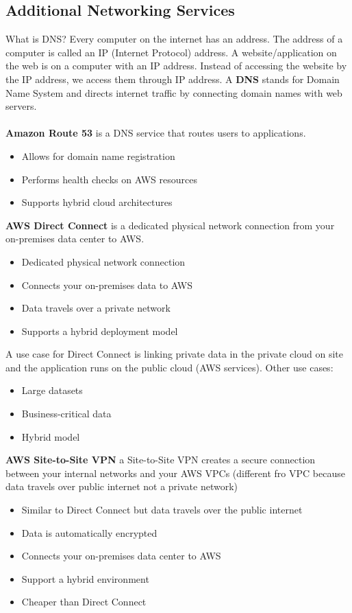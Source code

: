 \documentclass{article}%
\begin{document}
\subsection{Additional Networking Services}
What is DNS? Every computer on the internet has an address. The address of a computer is called an IP (Internet Protocol) address. A website/application on the web is on a computer with an IP address.
Instead of accessing the website by the IP address, we access them through IP address. A \textbf{DNS} stands for Domain Name System and directs internet traffic by connecting domain names with web servers. \\ \\
\textbf{Amazon Route 53} is a DNS service that routes users to applications.
\begin{itemize}
    \item Allows for domain name registration
    \item Performs health checks on AWS resources
    \item Supports hybrid cloud architectures
\end{itemize} 

\textbf{AWS Direct Connect} is a dedicated physical network connection from your on-premises data center to AWS.
\begin{itemize}
    \item Dedicated physical network connection
    \item Connects your on-premises data to AWS
    \item Data travels over a private network
    \item Supports a hybrid deployment model
\end{itemize}
A use case for Direct Connect is linking private data in the private cloud on site and the application runs on the public cloud (AWS services). Other use cases:
\begin{itemize}
    \item Large datasets
    \item Business-critical data
    \item Hybrid model
\end{itemize}

\textbf{AWS Site-to-Site VPN} a Site-to-Site VPN creates a secure connection between your internal networks and your AWS VPCs (different fro VPC because data travels over public internet not a private network)
\begin{itemize}
    \item Similar to Direct Connect but data travels over the public internet
    \item Data is automatically encrypted
    \item Connects your on-premises data center to AWS
    \item Support a hybrid environment
    \item Cheaper than Direct Connect
\end{itemize}
\end{document}
